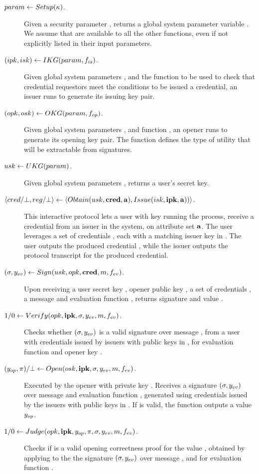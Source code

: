 \begin{description}
\item[$param \gets Setup(\kappa)$.] Given a security parameter \secpar,
  returns a global system parameter variable \parm. We assume that \parm are
  available to all the other functions, even if not explicitly listed in their
  input parameters.
\item[$(ipk,isk) \gets IKG(param,f_{is})$.] Given global system
  parameters \parm, and the function \fissue to be used to check that credential
  requestors meet the conditions to be issued a credential, an issuer runs
  \IKeyGen to generate its issuing key pair. 
\item[$(opk,osk) \gets OKG(param,f_{op})$.] Given global system
  parameters \parm, and function \finsp, an opener runs \OKeyGen to generate
  its opening key pair. The function \finsp defines the type of utility that
  will be extractable from signatures.
\item[$usk \gets UKG(param)$.] Given global system parameters
  \parm, returns a user's secret key.
\item[$\langle cred/\bot,reg/\bot \rangle \gets
  \langle
  Obtain(usk,\mathbf{cred},\mathbf{a}),
  Issue(isk,\mathbf{ipk},\mathbf{a}))
  \rangle$.] %
  This interactive protocol lets a user with key \usk running the
  \Obtain process, receive a credential \cred from an issuer in the system, on
  attribute set $\mathbf{a}$. The user leverages a set of credentials \scred,
  each with a matching issuer key in \sipk.
  The user outputs the produced credential \cred, while
  the issuer outputs the protocol transcript \utrans for the produced
  credential.
\item[$(\sigma,y_{ev}) \gets Sign(usk,opk,\mathbf{cred},m,f_{ev})$.] %
  Upon receiving a user secret key \usk, opener public key \opk, a set of
  credentials \scred, a message \msg and evaluation
  function \feval, returns signature \sig and value \yeval.
\item[$1/0 \gets Verify(opk, \mathbf{ipk},\sigma,y_{ev},m,f_{ev})$.]
  Checks whether $(\sigma,y_{ev})$ is a valid signature
  over message \msg, from a user with credentials issued by issuers with public
  keys in \sipk, for evaluation function \feval and opener key \opk.
\item[$(y_{op},\pi)/\bot \gets Open(osk,\mathbf{ipk},\sigma,y_{ev},m,f_{ev})$.]
  Executed by the opener with private key \osk. Receives a signature $(\sigma,
  y_{ev})$ over message \msg and evaluation function \feval, generated using
  credentials issued by the issuers with public keys in \sipk. If \sig is valid,
  the function outputs a value $y_{op}$.
\item[$1/0 \gets Judge(opk,\mathbf{ipk},y_{op},\pi,\sigma,y_{ev},m,f_{ev})$.] %
  Checks if \iproof is a valid opening correctness proof for the value \yinsp,
  obtained by applying \Open to the the signature $(\sigma,y_{ev})$ over
  message \msg, and for evaluation function \feval. 
\end{description}

